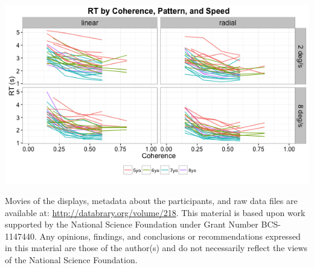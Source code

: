 \documentclass[landscape,final,paperwidth=60in,paperheight=41.5in,fontscale=0.285]{baposter}
\begin{document}
\begin{poster}
{\begin{center}
  \includegraphics[scale=0.7,valign=t]{img/rt-plot-1.png}
\end{center}
}
    {
       Movies of the displays, metadata about the participants, and raw data files are available at: \url{http://databrary.org/volume/218}.
     }
    {
    \smaller
      This material is based upon work supported by the National Science Foundation under Grant Number BCS-1147440. Any opinions, findings, and conclusions or recommendations expressed in this material are those of the author(s) and do not necessarily reflect the views of the National Science Foundation.
    }
  {
          \tiny
          \renewcommand{\refname}{\vspace{-0.5em}} %
          
          

}
\end{poster}%
%
\end{document}
